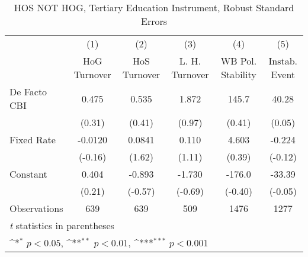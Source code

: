 \begin{table}[htbp]\centering
\def\sym#1{\ifmmode^{#1}\else\(^{#1}\)\fi}
\caption{HOS NOT HOG, Tertiary Education Instrument, Robust Standard Errors \label{NOhoshogIfivs2}}
\begin{tabular}{l*{5}{c}}
\toprule
                                        &\multicolumn{1}{c}{(1)}&\multicolumn{1}{c}{(2)}&\multicolumn{1}{c}{(3)}&\multicolumn{1}{c}{(4)}&\multicolumn{1}{c}{(5)}\\
                                        &\multicolumn{1}{c}{HoG Turnover}&\multicolumn{1}{c}{HoS Turnover}&\multicolumn{1}{c}{L. H. Turnover}&\multicolumn{1}{c}{WB Pol. Stability}&\multicolumn{1}{c}{Instab. Event}\\
\midrule
De Facto CBI                            &    0.475         &    0.535         &    1.872         &    145.7         &    40.28         \\
                                        &   (0.31)         &   (0.41)         &   (0.97)         &   (0.41)         &   (0.05)         \\
\addlinespace
Fixed Rate                              &  -0.0120         &   0.0841         &    0.110         &    4.603         &   -0.224         \\
                                        &  (-0.16)         &   (1.62)         &   (1.11)         &   (0.39)         &  (-0.12)         \\
\addlinespace
Constant                                &    0.404         &   -0.893         &   -1.730         &   -176.0         &   -33.39         \\
                                        &   (0.21)         &  (-0.57)         &  (-0.69)         &  (-0.40)         &  (-0.05)         \\
\midrule
Observations                            &      639         &      639         &      509         &     1476         &     1277         \\
\bottomrule
\multicolumn{6}{l}{\footnotesize \textit{t} statistics in parentheses}\\
\multicolumn{6}{l}{\footnotesize \sym{*} \(p<0.05\), \sym{**} \(p<0.01\), \sym{***} \(p<0.001\)}\\
\end{tabular}
\end{table}
